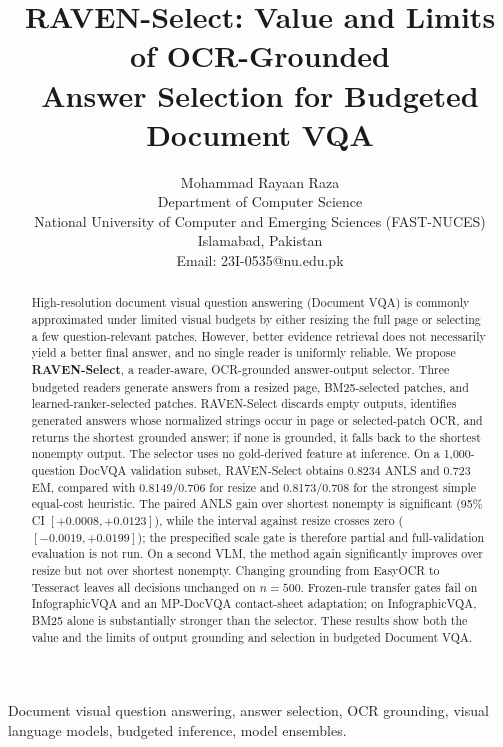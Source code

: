 \documentclass[journal]{IEEEtran}
\title{RAVEN-Select: Value and Limits of OCR-Grounded\\Answer Selection for Budgeted Document VQA}
\author{Mohammad Rayaan Raza\\
\normalsize Department of Computer Science\\
\normalsize National University of Computer and Emerging Sciences (FAST-NUCES)\\
\normalsize Islamabad, Pakistan\\
\normalsize Email: 23I-0535@nu.edu.pk}
\begin{document}
\maketitle

\begin{abstract}
High-resolution document visual question answering (Document VQA) is commonly
approximated under limited visual budgets by either resizing the full page or
selecting a few question-relevant patches.  However, better evidence retrieval
does not necessarily yield a better final answer, and no single reader is
uniformly reliable.  We propose \textbf{RAVEN-Select}, a reader-aware,
OCR-grounded answer-output selector.  Three budgeted readers generate answers
from a resized page, BM25-selected patches, and learned-ranker-selected patches.
RAVEN-Select discards empty outputs, identifies generated answers whose
normalized strings occur in page or selected-patch OCR, and returns the shortest
grounded answer; if none is grounded, it falls back to the shortest nonempty
output.  The selector uses no gold-derived feature at inference.  On a
1,000-question DocVQA validation subset, RAVEN-Select obtains 0.8234 ANLS and
0.723 EM, compared with 0.8149/0.706 for resize and 0.8173/0.708 for the
strongest simple equal-cost heuristic.  The paired ANLS gain over shortest
nonempty is significant (95\% CI $[+0.0008,+0.0123]$), while the interval
against resize crosses zero ($[-0.0019,+0.0199]$); the prespecified scale gate
is therefore partial and full-validation evaluation is not run.  On a second
VLM, the method again significantly improves over resize but not over shortest
nonempty.  Changing grounding from EasyOCR to Tesseract leaves all decisions
unchanged on $n=500$.  Frozen-rule transfer gates fail on InfographicVQA and
an MP-DocVQA contact-sheet adaptation; on InfographicVQA, BM25 alone is
substantially stronger than the selector.  These results show both the value
and the limits of output grounding and selection in budgeted Document VQA.
\end{abstract}

\begin{IEEEkeywords}
Document visual question answering, answer selection, OCR grounding, visual
language models, budgeted inference, model ensembles.
\end{IEEEkeywords}
\end{document}
